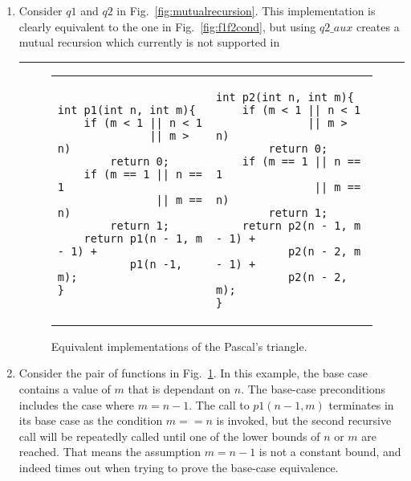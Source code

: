 \begin{enumerate}
\item Consider $q1$ and $q2$ in Fig.~\ref{fig:mutualrecursion}. This implementation is clearly equivalent to the one in Fig.~\ref{fig:f1f2cond}, but using $q2\_aux$ creates a mutual recursion which currently is not supported in \rule{MRC-PART-EQ}.


\begin{figure}[h]
\begin{center}
	\begin{tabular}{ll}
\begin{minipage}[t][5cm]{5.5 cm}
\begin{lstlisting}
int p1(int n, int m){
    if (m < 1 || n < 1
              || m > n)
        return 0;
    if (m == 1 || n == 1 
               || m == n)
        return 1;
    return p1(n - 1, m - 1) +
           p1(n -1, m);
}
\end{lstlisting}
\end{minipage} & 
\begin{minipage}[t][5cm]{7 cm}
\begin{lstlisting}
int p2(int n, int m){
    if (m < 1 || n < 1 
              || m > n)
        return 0;
    if (m == 1 || n == 1 
               || m == n)
        return 1;
    return p2(n - 1, m - 1) + 
           p2(n - 2, m - 1) + 
           p2(n - 2, m);
}
\end{lstlisting}
\end{minipage}
\end{tabular}
\caption{Equivalent implementations of the Pascal's triangle.}
\label{fig:pascal}
\end{center}
\end{figure}

\item Consider the pair of functions in Fig.~\ref{fig:pascal}. In this example, the base case contains a value of $m$ that is dependant on $n$. The base-case preconditions includes the case where $m=n-1$. The call to $p1(n-1,m)$ terminates in its base case as the condition $m==n$ is invoked, but the second recursive call will be repeatedly called until one of the lower bounds of $n$ or $m$ are reached. That means the assumption $m=n-1$ is not a constant bound, and indeed  times out when trying to prove the base-case equivalence.
\end{enumerate}

